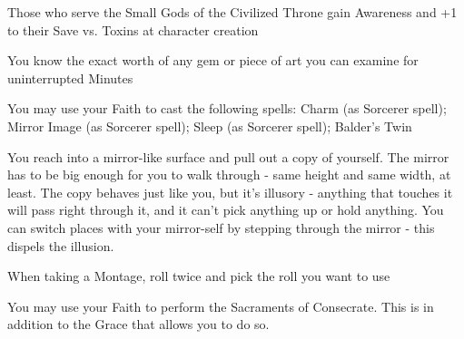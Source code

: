 {

Those who serve the Small Gods of the Civilized Throne gain \DCUP Awareness and +1 to their Save vs. Toxins at character creation




\GOD[
  Name=Balder,
  Link=small-god-balder,
  GodOf=Seraph of Beauty and Gems,
  Holy=a silver mirror
]



You know the exact worth of any gem or piece of art you can examine for uninterrupted Minutes


You may use your Faith to cast the following spells: Charm (as Sorcerer spell); Mirror Image (as Sorcerer spell); Sleep (as Sorcerer spell);  Balder's Twin

\LITURGY [
  Name= Balder's Twin,
  Link= balder-liturgy-balders-twin,
  Paradigm= Mind ,
  Save=  N ,
  Duration= \SUMDICE Minutes ,
  Counter=  n/a  ,
  Keywords= None ,
  Target=   Close (touch) mirror
]



You reach into a mirror-like surface and pull out a copy of yourself.  The mirror has to be big enough for you to walk through - same height and same width, at least.  The copy behaves just like you, but it's illusory - anything that touches it will pass right through it, and it can't pick anything up or hold anything.  You can switch places with your mirror-self by stepping through the mirror - this dispels the illusion.




\GOD[
Name=Gomorrah,
Link=small-god-gomorrah,
GodOf=Archfiend of Cities,
Holy=a single iron nail driven into the hand or wrist
]


When taking a Montage, roll twice and pick the roll you want to use


You may use your Faith to perform the Sacraments of Consecrate. This is in addition to the Grace that allows you to do so.




}
